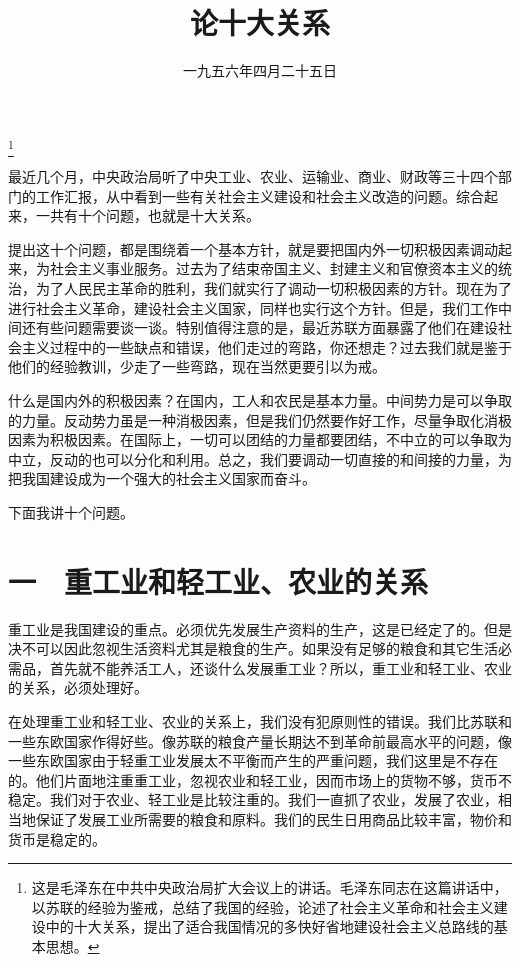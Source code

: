 
\title{论十大关系}
\date{一九五六年四月二十五日}
\thanks{这是毛泽东在中共中央政治局扩大会议上的讲话。毛泽东同志在这篇讲话中，以苏联的经验为鉴戒，总结了我国的经验，论述了社会主义革命和社会主义建设中的十大关系，提出了适合我国情况的多快好省地建设社会主义总路线的基本思想。}
\maketitle


最近几个月，中央政治局听了中央工业、农业、运输业、商业、财政等三十四个部门的工作汇报，从中看到一些有关社会主义建设和社会主义改造的问题。综合起来，一共有十个问题，也就是十大关系。

提出这十个问题，都是围绕着一个基本方针，就是要把国内外一切积极因素调动起来，为社会主义事业服务。过去为了结束帝国主义、封建主义和官僚资本主义的统治，为了人民民主革命的胜利，我们就实行了调动一切积极因素的方针。现在为了进行社会主义革命，建设社会主义国家，同样也实行这个方针。但是，我们工作中间还有些问题需要谈一谈。特别值得注意的是，最近苏联方面暴露了他们在建设社会主义过程中的一些缺点和错误，他们走过的弯路，你还想走？过去我们就是鉴于他们的经验教训，少走了一些弯路，现在当然更要引以为戒。

什么是国内外的积极因素？在国内，工人和农民是基本力量。中间势力是可以争取的力量。反动势力虽是一种消极因素，但是我们仍然要作好工作，尽量争取化消极因素为积极因素。在国际上，一切可以团结的力量都要团结，不中立的可以争取为中立，反动的也可以分化和利用。总之，我们要调动一切直接的和间接的力量，为把我国建设成为一个强大的社会主义国家而奋斗。

下面我讲十个问题。

\section{一　重工业和轻工业、农业的关系}

重工业是我国建设的重点。必须优先发展生产资料的生产，这是已经定了的。但是决不可以因此忽视生活资料尤其是粮食的生产。如果没有足够的粮食和其它生活必需品，首先就不能养活工人，还谈什么发展重工业？所以，重工业和轻工业、农业的关系，必须处理好。

在处理重工业和轻工业、农业的关系上，我们没有犯原则性的错误。我们比苏联和一些东欧国家作得好些。像苏联的粮食产量长期达不到革命前最高水平的问题，像一些东欧国家由于轻重工业发展太不平衡而产生的严重问题，我们这里是不存在的。他们片面地注重重工业，忽视农业和轻工业，因而市场上的货物不够，货币不稳定。我们对于农业、轻工业是比较注重的。我们一直抓了农业，发展了农业，相当地保证了发展工业所需要的粮食和原料。我们的民生日用商品比较丰富，物价和货币是稳定的。

